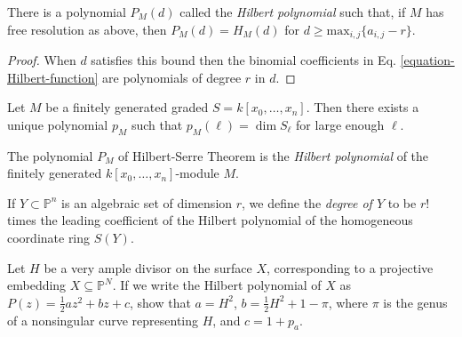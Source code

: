 \begin{lemma}
\label{lemma-hilbe-funct-becom-polyn}
There is a polynomial $P_M(d)$ called the
{\it Hilbert polynomial} such that, if
$M$ has free resolution as above, then
$P_M(d)=H_M(d)$ for
$d\geq\text{max}_{i,j}\{a_{i,j}-r\}$.
\end{lemma}

\begin{proof}
When $d$ satisfies this bound then the
binomial coefficients in Eq.
\ref{equation-Hilbert-function} are
polynomials of degree $r$ in $d$.
\end{proof}

\begin{theorem}
\label{theorem-Hilbert-Serre}
\begin{reference}
\cite[I, Theorem 7.5]{hart}
\end{reference}
Let $M$ be a finitely generated graded
$S=k[x_0,\ldots,x_n]$. Then there exists
a unique polynomial $p_M$ such that
$p_M(\ell)=\dim S_\ell$ for large enough
$\ell$.
\end{theorem}

\begin{definition}
\label{definition-Hilbert-polynomial}
\begin{reference}
\cite[I, p. 52]{har}
\end{reference}
The polynomial $P_M$ of Hilbert-Serre Theorem
\cite{Hilbert-Serre} is the {\it
Hilbert polynomial} of the finitely generated
$k[x_0,\ldots,x_n]$-module $M$.
\end{definition}

\begin{definition}
\label{definition-degre-proje-varie}
\begin{reference}
\cite[p. 52]{hart}
\end{reference}
If $Y\subset \mathbb{P}^n$ is an algebraic
set of dimension $r$, we define the
{\it degree of $Y$} to be $r!$ times the
leading coefficient of the Hilbert
polynomial of the homogeneous coordinate ring
$S(Y)$.
\end{definition}

\begin{exercise}
\label{exercise-very-ample-bundl-self-inte}
\begin{reference}
\cite[V, Exercise 1.2]{har}
\end{reference}
Let $H$ be a very ample divisor on the
surface $X$, corresponding to a
projective embedding
$X\subseteq\mathbb{P}^N$. If we write the
Hilbert
polynomial of $X$ as
$P(z)=\frac{1}{2}az^2+bz+c$, show that
$a=H^2$,
$b=\frac{1}{2}H^2+1-\pi$, where $\pi$ is the
genus of a nonsingular curve
representing $H$, and $c=1+p_a$.
\end{exercise}

